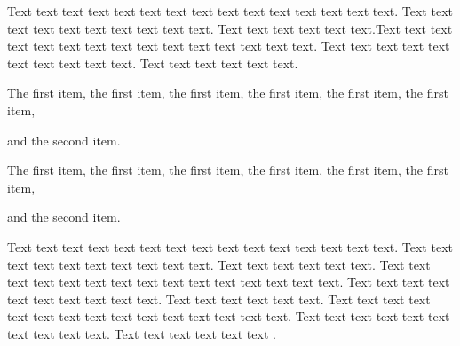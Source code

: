 Text text text text text text text text text text text text text text text. Text text text text text text text text text text. Text text text text text text.Text text text text text text text text text text text text text text text. Text text text text text text text text text text. Text text text text text text.

\begin{listi}
	\item The first item, the first item, the first item, the first item, the first item, the first item,
	\item and the second item.
\end{listi}

\begin{lista}
	\item The first item, the first item, the first item, the first item, the first item, the first item, 
	\item and the second item.
\end{lista}

Text text text text text text text text text text text text text text text. Text text text text text text text text text text. Text text text text text text. Text text text text text text text text text text text text text text text. Text text text text text text text text text text. Text text text text text text. Text text text text text text text text text text text text text text text. Text text text text text text text text text text. Text text text text text text \citet{Blomstrom2003}. 